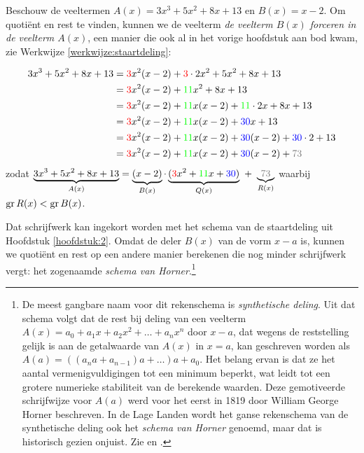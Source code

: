 \documentclass{ximera}
\begin{document}
\begin{algorithm} 
Beschouw de veeltermen $A(x) = 3x^3+5x^2+8x+13$ en $B(x) = x-2$. Om quotiënt en rest te vinden, kunnen we de veelterm 
\textit{ de veelterm $B(x)$ forceren in de veelterm $A(x)$}, een manier die ook al in het vorige hoofdstuk aan bod kwam, zie Werkwijze \ref{werkwijze:staartdeling}:


\begin{align*}
3x^3+5x^2+8x+13
& = {\red{3}}x^2(x-2) + {\red{3}}\cdot 2x^2 + 5x^2 + 8x + 13 \\
& = {\red{3}}x^2(x-2) + {\green{11}}x^2 + 8x + 13 \\
& = {\red{3}}x^2(x-2) + {\green{11}}x(x-2) + {\green{11}}\cdot 2x + 8x + 13 \\
& = {\red{3}}x^2(x-2) + {\green{11}}x(x-2) + {\blue{30}}x + 13 \\
& = {\red{3}}x^2(x-2) + {\green{11}}x(x-2) + {\blue{30}}(x-2) + {\blue{30}} \cdot 2 + 13 \\
& = {\red{3}}x^2(x-2) + {\green{11}}x(x-2) + {\blue{30}}(x-2) + {\gray{73}} %
\end{align*}
zodat $\D \underbrace{3x^3+5x^2+8x+13}_{A(x)} = \underbrace{(x-2)}_{B(x)}\cdot\underbrace{({\red{3}}x^2 + {\green{11}}x + {\blue{30}})}_{Q(x)} \,\, + \,\, \underbrace{{\gray{73}}}_{R(x)}$ waarbij $\operatorname{gr} R(x) < \operatorname{gr} B(x)$.

Dat schrijfwerk kan ingekort worden met het schema van de staartdeling uit Hoofdstuk \ref{hoofdstuk:2}. Omdat de deler $B(x)$ van de vorm $x-a$ is, kunnen we quotiënt en rest op een andere manier berekenen die nog minder schrijfwerk vergt: het zogenaamde \textit{ schema van Horner}.\footnote{De meest gangbare naam voor dit rekenschema is \textit{ synthetische deling}. Uit dat schema volgt dat de rest bij deling van een veelterm $A(x) = a_0 + a_1x + a_2x^2 + \dots + a_nx^n$ door $x-a$, dat wegens de reststelling gelijk is aan de getalwaarde van $A(x)$ in $x=a$, kan geschreven worden als $A(a) = ((a_n a +a_{n-1})a+\dots)a+a_0$. Het belang ervan is dat ze het aantal vermenigvuldigingen tot een minimum beperkt, wat leidt tot een grotere numerieke stabiliteit van de berekende waarden. Deze gemotiveerde schrijfwijze voor $A(a)$ werd voor het eerst in 1819 door William George Horner beschreven. In de Lage Landen wordt het ganse rekenschema van de synthetische deling ook het \textit{ schema van Horner} genoemd, maar dat is historisch gezien onjuist. Zie \cite{Cajori} en \cite{wiki:Hornerschema}.} 
\renewcommand{\kolbreed}{\widthof{$2 \cdot 30$}}

\end{algorithm} 
\end{document}
